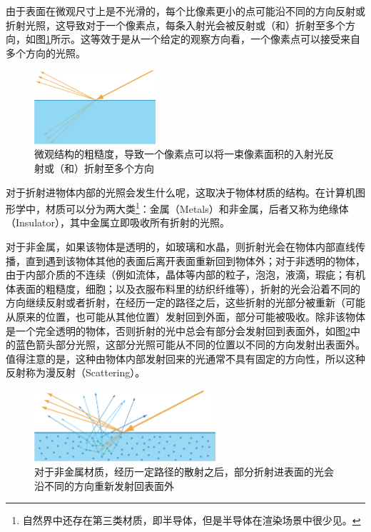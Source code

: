 由于表面在微观尺寸上是不光滑的，每个比像素更小的点可能沿不同的方向反射或折射光照，这导致对于一个像素点，每条入射光会被反射或（和）折射至多个方向，如图\ref{f:intro-multi-rays}所示。这等效于是从一个给定的观察方向看，一个像素点可以接受来自多个方向的光照。

\begin{figure}
\sidecaption
	\includegraphics[width=0.4\textwidth]{figures/intro/ray-optics-4}
	\caption{微观结构的粗糙度，导致一个像素点可以将一束像素面积的入射光反射或（和）折射至多个方向}
	\label{f:intro-multi-rays}
\end{figure}

对于折射进物体内部的光照会发生什么呢，这取决于物体材质的结构。在计算机图形学中，材质可以分为两大类\footnote{自然界中还存在第三类材质，即半导体，但是半导体在渲染场景中很少见。}：金属（Metals）和非金属，后者又称为绝缘体（Insulator），其中金属立即吸收所有折射的光照。


对于非金属，如果该物体是透明的，如玻璃和水晶，则折射光会在物体内部直线传播，直到遇到该物体其他的表面后离开表面重新回到物体外；对于非透明的物体，由于内部介质的不连续（例如流体，晶体等内部的粒子，泡泡，液滴，瑕疵；有机体表面的粗糙度，细胞；以及衣服布料里的纺织纤维等），折射的光会沿着不同的方向继续反射或者折射，在经历一定的路径之后，这些折射的光部分被重新（可能从原来的位置，也可能从其他位置）发射回到外面，部分可能被吸收。除非该物体是一个完全透明的物体，否则折射的光中总会有部分会发射回到表面外，如图\ref{f:intro-refraction}中的蓝色箭头部分光照，这部分光照可能从不同的位置以不同的方向发射出表面外。值得注意的是，这种由物体内部发射回来的光通常不具有固定的方向性，所以这种反射称为漫反射（Scattering）。

\begin{figure}
\sidecaption
	\includegraphics[width=0.6\textwidth]{figures/intro/ray-optics-5}
	\caption{对于非金属材质，经历一定路径的散射之后，部分折射进表面的光会沿不同的方向重新发射回表面外}
	\label{f:intro-refraction} 
\end{figure}

